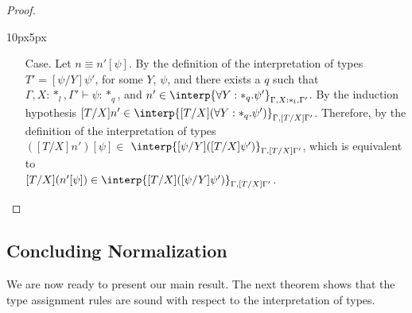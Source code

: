 \begin{proof}
\begin{changemargin}{10px}{5px}
\begin{itemize}
\item[Case.]  Let $n \equiv n'[\psi]$.  By the definition of the
  interpretation of types $T' = [\psi/Y]\psi'$, for some $Y$, $\psi$, and 
  there exists a $q$ such that $\Gamma,X:*_l,\Gamma' \vdash \psi:*_q$, and 
  $n' \in \interp{\forall Y:*_q.\psi'}_{\Gamma,X:*_l,\Gamma'}$.  By the 
  induction hypothesis 
  $[T/X]n' \in \interp{[T/X](\forall Y:*_q.\psi')}_{\Gamma,[T/X]\Gamma'}$.
  Therefore, by the definition of the interpretation of types\\
  $([T/X]n')[\psi] \in$
  $ \interp{[\psi/Y]([T/X]\psi')}_{\Gamma,[T/X]\Gamma'}$, which is equivalent
  to \\
  $[T/X](n'[\psi]) \in \interp{[T/X]([\psi/Y]\psi')}_{\Gamma,[T/X]\Gamma'}$.
\end{itemize}
\end{changemargin}
\end{proof}

\subsection{Concluding Normalization}
\label{subsec:soundness_of_typing_ssf}
We are now ready to present our main result.  The next theorem shows
that the type assignment rules are sound with respect to the
interpretation of types.  


